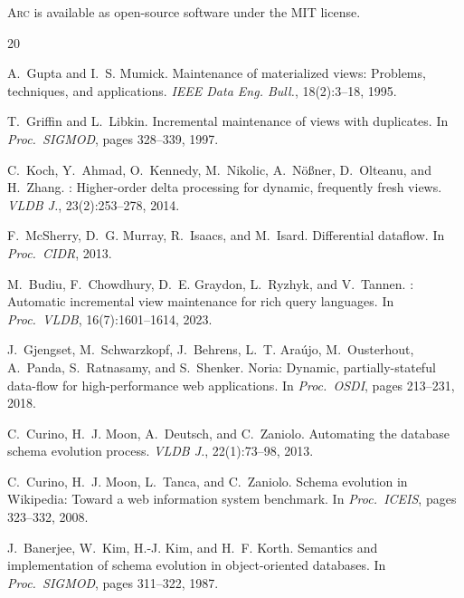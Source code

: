 \documentclass[sigplan,screen,nonacm]{acmart}
\newcommand{\arc}{\textsc{Arc}\xspace}
\begin{document}
\arc is available as open-source software under the MIT license.



\begin{thebibliography}{20}

A.~Gupta and I.~S. Mumick.
\newblock Maintenance of materialized views: Problems, techniques, and
  applications.
\newblock \emph{IEEE Data Eng. Bull.}, 18(2):3--18, 1995.

T.~Griffin and L.~Libkin.
\newblock Incremental maintenance of views with duplicates.
\newblock In \emph{Proc.\ SIGMOD}, pages 328--339, 1997.

C.~Koch, Y.~Ahmad, O.~Kennedy, M.~Nikolic, A.~N\"o{\ss}ner, D.~Olteanu,
  and H.~Zhang.
: Higher-order delta processing for dynamic, frequently
  fresh views.
\newblock \emph{VLDB J.}, 23(2):253--278, 2014.

F.~McSherry, D.~G. Murray, R.~Isaacs, and M.~Isard.
\newblock Differential dataflow.
\newblock In \emph{Proc.\ CIDR}, 2013.

M.~Budiu, F.~Chowdhury, D.~E. Graydon, L.~Ryzhyk, and V.~Tannen.
: Automatic incremental view maintenance for rich query
  languages.
\newblock In \emph{Proc.\ VLDB}, 16(7):1601--1614, 2023.

J.~Gjengset, M.~Schwarzkopf, J.~Behrens, L.~T. Ara\'ujo, M.~Ousterhout,
  A.~Panda, S.~Ratnasamy, and S.~Shenker.
\newblock Noria: Dynamic, partially-stateful data-flow for high-performance web
  applications.
\newblock In \emph{Proc.\ OSDI}, pages 213--231, 2018.

C.~Curino, H.~J. Moon, A.~Deutsch, and C.~Zaniolo.
\newblock Automating the database schema evolution process.
\newblock \emph{VLDB J.}, 22(1):73--98, 2013.

C.~Curino, H.~J. Moon, L.~Tanca, and C.~Zaniolo.
\newblock Schema evolution in {Wikipedia}: Toward a web information system
  benchmark.
\newblock In \emph{Proc.\ ICEIS}, pages 323--332, 2008.

J.~Banerjee, W.~Kim, H.-J. Kim, and H.~F. Korth.
\newblock Semantics and implementation of schema evolution in object-oriented
  databases.
\newblock In \emph{Proc.\ SIGMOD}, pages 311--322, 1987.


\end{thebibliography}
\end{document}
